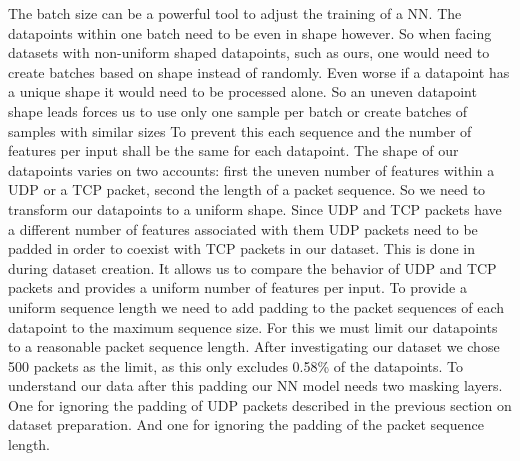 \documentclass[
	ngerman,
	ruledheaders=section,%
	class=report,%
	thesis={type=bachelor},%
	accentcolor=9c,%
	custommargins=true,%
	marginpar=false,%
	parskip=half-,%
	fontsize=11pt,%
]{tudapub}
\begin{document}
The batch size can be a powerful tool to adjust the training of a NN.
The datapoints within one batch need to be even in shape however.
So when facing datasets with non-uniform shaped datapoints, such as ours, one would need to create batches based on shape instead of randomly.
Even worse if a datapoint has a unique shape it would need to be processed alone.
So an uneven datapoint shape leads forces us to use only one sample per batch or create batches of samples with similar sizes
To prevent this each sequence and the number of features per input shall be the same for each datapoint.
The shape of our datapoints varies on two accounts: first the uneven number of features within a UDP or a TCP packet, second the length of a packet sequence.
So we need to transform our datapoints to a uniform shape.
Since UDP and TCP packets have a different number of features associated with them UDP packets need to be padded in order to coexist with TCP packets in our dataset.
This is done in during dataset creation.
It allows us to compare the behavior of UDP and TCP packets and provides a uniform number of features per input.
To provide a uniform sequence length we need to add padding to the packet sequences of each datapoint to the maximum sequence size.
For this we must limit our datapoints to a reasonable packet sequence length.
After investigating our dataset we chose 500 packets as the limit, as this only excludes 0.58\% of the datapoints.
To understand our data after this padding our NN model needs two masking layers.
One for ignoring the padding of UDP packets described in the previous section on dataset preparation.
And one for ignoring the padding of the packet sequence length.



\end{document}
